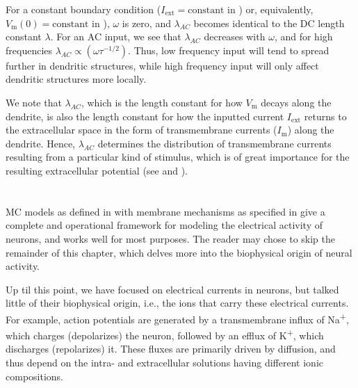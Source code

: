For a constant boundary condition ($I_\text{ext} = \text{constant}$ in ) or, equivalently, $V_\mathrm{m}(0) = \text{constant}$ in ), $\omega$ is zero, and $\lambda_{AC}$ becomes identical to the DC length constant $\lambda$. For an AC input, we see that $\lambda_{AC}$ decreases with $\omega$, and for high frequencies $\lambda_{AC} \propto (\omega \tau^{-1/2})$. Thus, low frequency input will tend to spread further in dendritic structures, while high frequency input will only affect dendritic structures more locally. 

We note that $\lambda_{AC}$, which is the length constant for how $V_\mathrm{m}$ decays along the dendrite, is also the length constant for how the inputted current $I_\text{ext}$ returns to the extracellular space in the form of transmembrane currents ($I_\text{m}$) along the dendrite. Hence, $\lambda_{AC}$ determines the distribution of transmembrane currents resulting from a particular kind of stimulus, which is of great importance for the resulting extracellular potential (see  and  ).


\section{}
\label{sec:Neuron:Ions_and_reversals}
MC models as defined in  with membrane mechanisms as specified in  give a complete and operational framework for modeling the electrical activity of neurons, and works well for most purposes. The reader may chose to skip the remainder of this chapter, which delves more into the biophysical origin of neural activity. 

Up til this point, we have focused on electrical currents in neurons, but talked little of their biophysical origin, i.e., the ions that carry these electrical currents. For example, action potentials are generated by a transmembrane influx of Na\textsuperscript{+}, 
which charges (depolarizes) the neuron, followed by an efflux of K\textsuperscript{+}, which discharges (repolarizes) it. These fluxes are primarily driven by diffusion, and thus depend on the intra- and extracellular solutions having different ionic compositions. 

